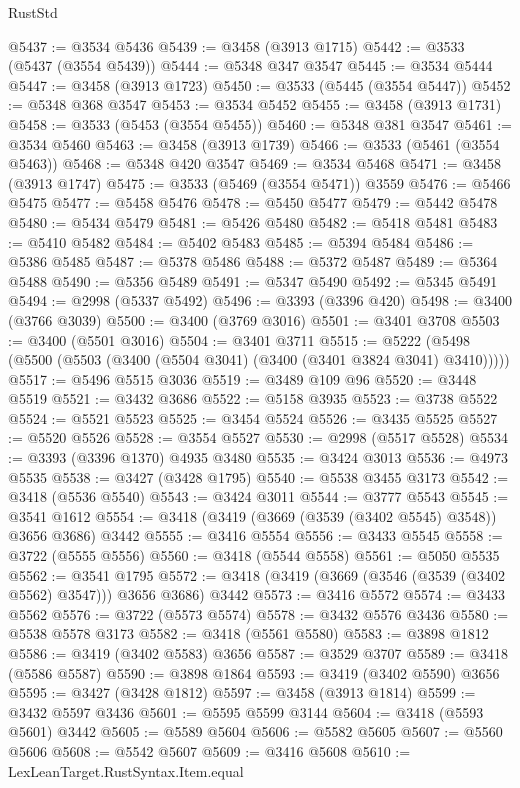 \begin{lexlean}{RustStd}
\begin{coremodule}
@5437 := @3534 @5436
@5439 := @3458 (@3913 @1715)
@5442 := @3533 (@5437 (@3554 @5439))
@5444 := @5348 @347 @3547
@5445 := @3534 @5444
@5447 := @3458 (@3913 @1723)
@5450 := @3533 (@5445 (@3554 @5447))
@5452 := @5348 @368 @3547
@5453 := @3534 @5452
@5455 := @3458 (@3913 @1731)
@5458 := @3533 (@5453 (@3554 @5455))
@5460 := @5348 @381 @3547
@5461 := @3534 @5460
@5463 := @3458 (@3913 @1739)
@5466 := @3533 (@5461 (@3554 @5463))
@5468 := @5348 @420 @3547
@5469 := @3534 @5468
@5471 := @3458 (@3913 @1747)
@5475 := @3533 (@5469 (@3554 @5471)) @3559
@5476 := @5466 @5475
@5477 := @5458 @5476
@5478 := @5450 @5477
@5479 := @5442 @5478
@5480 := @5434 @5479
@5481 := @5426 @5480
@5482 := @5418 @5481
@5483 := @5410 @5482
@5484 := @5402 @5483
@5485 := @5394 @5484
@5486 := @5386 @5485
@5487 := @5378 @5486
@5488 := @5372 @5487
@5489 := @5364 @5488
@5490 := @5356 @5489
@5491 := @5347 @5490
@5492 := @5345 @5491
@5494 := @2998 (@5337 @5492)
@5496 := @3393 (@3396 @420)
@5498 := @3400 (@3766 @3039)
@5500 := @3400 (@3769 @3016)
@5501 := @3401 @3708
@5503 := @3400 (@5501 @3016)
@5504 := @3401 @3711
@5515 := @5222 (@5498 (@5500 (@5503 (@3400 (@5504 @3041) (@3400 (@3401 @3824 @3041) @3410)))))
@5517 := @5496 @5515 @3036
@5519 := @3489 @109 @96
@5520 := @3448 @5519
@5521 := @3432 @3686
@5522 := @5158 @3935
@5523 := @3738 @5522
@5524 := @5521 @5523
@5525 := @3454 @5524
@5526 := @3435 @5525
@5527 := @5520 @5526
@5528 := @3554 @5527
@5530 := @2998 (@5517 @5528)
@5534 := @3393 (@3396 @1370) @4935 @3480
@5535 := @3424 @3013
@5536 := @4973 @5535
@5538 := @3427 (@3428 @1795)
@5540 := @5538 @3455 @3173
@5542 := @3418 (@5536 @5540)
@5543 := @3424 @3011
@5544 := @3777 @5543
@5545 := @3541 @1612
@5554 := @3418 (@3419 (@3669 (@3539 (@3402 @5545) @3548)) @3656 @3686) @3442
@5555 := @3416 @5554
@5556 := @3433 @5545
@5558 := @3722 (@5555 @5556)
@5560 := @3418 (@5544 @5558)
@5561 := @5050 @5535
@5562 := @3541 @1795
@5572 := @3418 (@3419 (@3669 (@3546 (@3539 (@3402 @5562) @3547))) @3656 @3686) @3442
@5573 := @3416 @5572
@5574 := @3433 @5562
@5576 := @3722 (@5573 @5574)
@5578 := @3432 @5576 @3436
@5580 := @5538 @5578 @3173
@5582 := @3418 (@5561 @5580)
@5583 := @3898 @1812
@5586 := @3419 (@3402 @5583) @3656
@5587 := @3529 @3707
@5589 := @3418 (@5586 @5587)
@5590 := @3898 @1864
@5593 := @3419 (@3402 @5590) @3656
@5595 := @3427 (@3428 @1812)
@5597 := @3458 (@3913 @1814)
@5599 := @3432 @5597 @3436
@5601 := @5595 @5599 @3144
@5604 := @3418 (@5593 @5601) @3442
@5605 := @5589 @5604
@5606 := @5582 @5605
@5607 := @5560 @5606
@5608 := @5542 @5607
@5609 := @3416 @5608
@5610 := LexLeanTarget.RustSyntax.Item.equal

\end{coremodule}
\end{lexlean}
